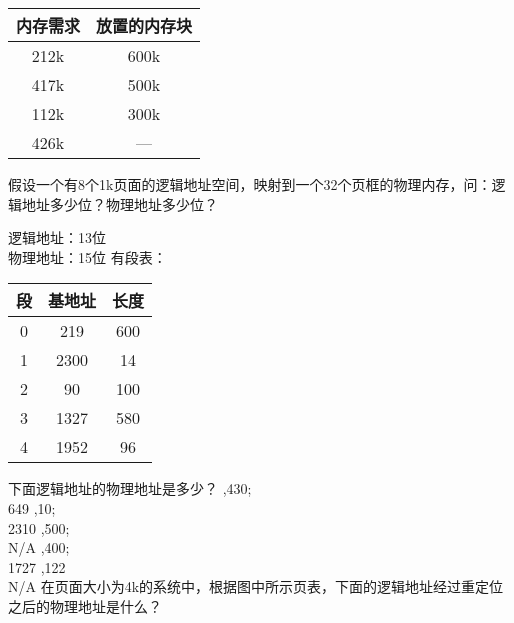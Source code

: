 \documentclass{ctexart}
\begin{document}
\begin{outline}[enumerate]
\begin{multicols}{3}
            \begin{center}
                \begin{tabular}{c c}
                    \toprule
                    内存需求 & 放置的内存块 \\
                    \midrule
                    212k & 600k \\
                    417k & 500k \\
                    112k & 300k \\
                    426k & --- \\
                    \bottomrule
                \end{tabular}
            \end{center}
        \end{multicols}
    \1 假设一个有8个1k页面的逻辑地址空间，映射到一个32个页框的物理内存，问：逻辑地址多少位？物理地址多少位？
        
        逻辑地址：13位 \\
        物理地址：15位
    \1 有段表：
        \begin{center}
            \begin{tabular}{ccc} 
                \toprule
                段 & 基地址  & 长度   \\
                \midrule
                0 & 219  & 600  \\
                1 & 2300 & 14   \\
                2 & 90   & 100  \\
                3 & 1327 & 580  \\
                4 & 1952 & 96   \\
                \bottomrule
                \end{tabular}
        \end{center}
        下面逻辑地址的物理地址是多少？
        ,430; \\
            649
        ,10; \\
            2310
        ,500; \\
            N/A
        ,400; \\
            1727
        ,122 \\
            N/A
    \1 在页面大小为4k的系统中，根据图中所示页表，下面的逻辑地址经过重定位之后的物理地址是什么？
    

\end{outline}
\end{document}
